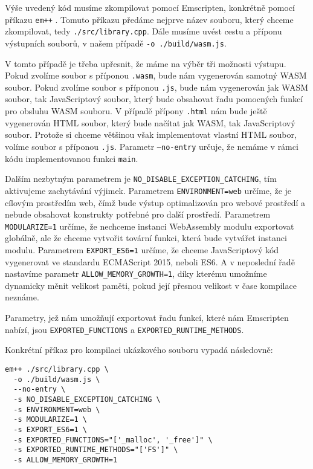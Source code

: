 \documentclass{{template/ctuthesis}}
\begin{document}
Výše uvedený kód musíme zkompilovat pomocí Emscripten, konkrétně pomocí příkazu \texttt{em++} \cite{emcc}. Tomuto příkazu předáme nejprve název souboru, který chceme zkompilovat, tedy \texttt{./src/library.cpp}. Dále musíme uvést cestu a příponu výstupních souborů, v našem případě \texttt{-o ./build/wasm.js}.

V tomto případě je třeba upřesnit, že máme na výběr tři možnosti výstupu. Pokud zvolíme soubor s příponou \texttt{.wasm}, bude nám vygenerován samotný WASM soubor. Pokud zvolíme soubor s příponou \texttt{.js}, bude nám vygenerován jak WASM soubor, tak JavaScriptový soubor, který bude obsahovat řadu pomocných funkcí pro obsluhu WASM souboru. V případě přípony \texttt{.html} nám bude ještě vygenerován HTML soubor, který bude načítat jak WASM, tak JavaScriptový soubor. Protože si chceme většinou však implementovat vlastní HTML soubor, volíme soubor s příponou \texttt{.js}. Parametr \texttt{--no-entry} určuje, že nemáme v rámci kódu implementovanou funkci \texttt{main}.

Dalším nezbytným parametrem je \texttt{NO\_DISABLE\_EXCEPTION\_CATCHING}, tím aktivujeme zachytávání výjimek. Parametrem \texttt{ENVIRONMENT=web} určíme, že je cílovým prostředím web, čímž bude výstup optimalizován pro webové prostředí a nebude obsahovat konstrukty potřebné pro další prostředí. Parametrem \texttt{MODULARIZE=1} určíme, že nechceme instanci WebAssembly modulu exportovat globálně, ale že chceme vytvořit tovární funkci, která bude vytvářet instanci modulu. Parametrem \texttt{EXPORT\_ES6=1} určíme, že chceme JavaScriptový kód vygenerovat ve standardu ECMAScript 2015, neboli ES6. A v neposlední řadě nastavíme parametr \texttt{ALLOW\_MEMORY\_GROWTH=1}, díky kterému umožníme dynamicky měnit velikost paměti, pokud její přesnou velikost v čase kompilace neznáme.

Parametry, jež nám umožňují exportovat řadu funkcí, které nám Emscripten nabízí, jsou \texttt{EXPORTED\_FUNCTIONS} a \texttt{EXPORTED\_RUNTIME\_METHODS}.

Konkrétní příkaz pro kompilaci ukázkového souboru vypadá následovně:

\begin{verbatim}
em++ ./src/library.cpp \
  -o ./build/wasm.js \
  --no-entry \
  -s NO_DISABLE_EXCEPTION_CATCHING \
  -s ENVIRONMENT=web \
  -s MODULARIZE=1 \
  -s EXPORT_ES6=1 \
  -s EXPORTED_FUNCTIONS="['_malloc', '_free']" \
  -s EXPORTED_RUNTIME_METHODS="['FS']" \
  -s ALLOW_MEMORY_GROWTH=1
\end{verbatim}
\end{document}
